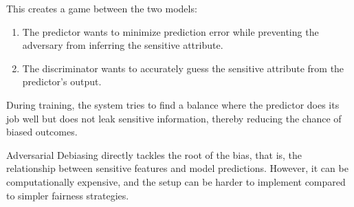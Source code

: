 \par This creates a game between the two models:
\begin{enumerate}
\item The predictor wants to minimize prediction error while preventing the adversary from inferring the sensitive attribute.
\item The discriminator wants to accurately guess the sensitive attribute from the predictor’s output.
\end{enumerate}
\par During training, the system tries to find a balance where the predictor does its job well but does not leak sensitive information, thereby reducing the chance of biased outcomes.
\par Adversarial Debiasing directly tackles the root of the bias, that is, the relationship between sensitive features and model predictions. However,  it can be computationally expensive, and the setup can be harder to implement compared to simpler fairness strategies. 

\begin{VCSet}
    \begin{visualComponent}
    \end{visualComponent}
    
    \begin{visualComponent}
    \end{visualComponent}
\end{VCSet}



